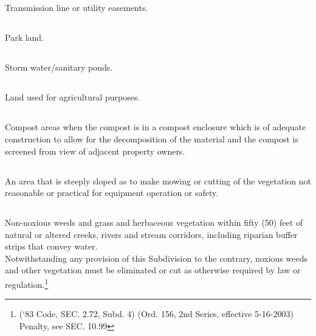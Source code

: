 \subsection{}
Transmission line or utility easements.
\subsection{}
Park land.
\subsection{}
Storm water/sanitary ponds.
\subsection{}
Land used for agricultural purposes.
\subsection{}
Compost areas when the compost is in a compost enclosure which is of adequate construction to allow for the decomposition of the material and the compost is screened from view of adjacent property owners.
\subsection{}
An area that is steeply sloped as to make mowing or cutting of the vegetation not reasonable or practical for equipment operation or safety.
\subsection{}
Non-noxious weeds and grass and herbaceous vegetation within fifty (50) feet of natural or altered creeks, rivers and stream corridors, including riparian buffer strips that convey water.\\
Notwithstanding any provision of this Subdivision to the contrary, noxious weeds and other vegetation must be eliminated or cut as otherwise required by law or regulation.\footnote{(‘83 Code, SEC. 2.72, Subd. 4)  (Ord. 156, 2nd Series, effective 5-16-2003)  Penalty, see SEC. 10.99}\\


\setcounter{section}{59}

